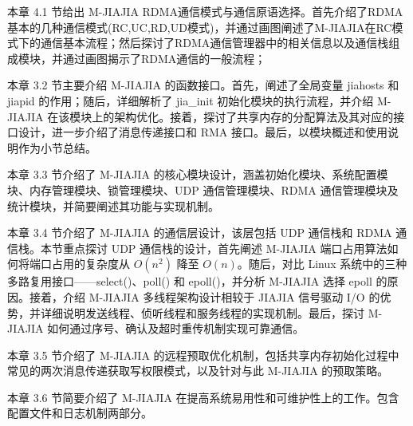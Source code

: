 {本章 4.1 节给出 M-JIAJIA RDMA通信模式与通信原语选择。首先介绍了RDMA基本的几种通信模式(RC,UC,RD,UD模式)，并通过画图阐述了M-JIAJIA在RC模式下的通信基本流程；然后探讨了RDMA通信管理器中的相关信息以及通信栈组成模块，并通过画图揭示了RDMA通信的一般流程；

本章 3.2 节主要介绍 M-JIAJIA 的函数接口。首先，阐述了全局变量 jiahosts 和 jiapid 的作用；随后，详细解析了 jia\_init 初始化模块的执行流程，并介绍 M-JIAJIA 在该模块上的架构优化。接着，探讨了共享内存的分配算法及其对应的接口设计，进一步介绍了消息传递接口和 RMA 接口。最后，以模块概述和使用说明作为小节总结。

本章 3.3 节介绍了 M-JIAJIA 的核心模块设计，涵盖初始化模块、系统配置模块、内存管理模块、锁管理模块、UDP 通信管理模块、RDMA 通信管理模块及统计模块，并简要阐述其功能与实现机制。

本章 3.4 节介绍了 M-JIAJIA 的通信层设计，该层包括 UDP 通信栈和 RDMA 通信栈。本节重点探讨 UDP 通信栈的设计，首先阐述 M-JIAJIA 端口占用算法如何将端口占用的复杂度从 $O(n^2)$ 降至 $O(n)$。随后，对比 Linux 系统中的三种多路复用接口——select()、poll() 和 epoll()，并分析 M-JIAJIA 选择 epoll 的原因。接着，介绍 M-JIAJIA 多线程架构设计相较于 JIAJIA 信号驱动 I/O 的优势，并详细说明发送线程、侦听线程和服务线程的实现机制。最后，探讨 M-JIAJIA 如何通过序号、确认及超时重传机制实现可靠通信。

本章 3.5 节介绍了 M-JIAJIA 的远程预取优化机制，包括共享内存初始化过程中常见的两次消息传递获取写权限模式，以及针对与此 M-JIAJIA 的预取策略。

本章 3.6 节简要介绍了 M-JIAJIA 在提高系统易用性和可维护性上的工作。包含配置文件和日志机制两部分。
}
